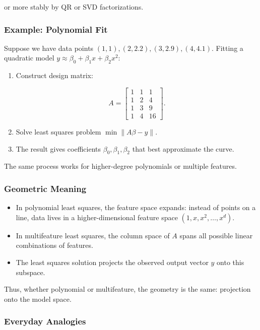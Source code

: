 \documentclass[
  letterpaper,
  DIV=11,
  numbers=noendperiod]{scrreprt}
\providecommand{\tightlist}{%
  \setlength{\itemsep}{0pt}\setlength{\parskip}{0pt}}
\begin{document}
or more stably by QR or SVD factorizations.

\subsubsection{Example: Polynomial Fit}\label{example-polynomial-fit}

Suppose we have data points \((1,1), (2,2.2), (3,2.9), (4,4.1)\).
Fitting a quadratic model
\(y \approx \beta_0 + \beta_1 x + \beta_2 x^2\):

\begin{enumerate}
\def\labelenumi{\arabic{enumi}.}
\item
  Construct design matrix:

  \[
  A = \begin{bmatrix}
  1 & 1 & 1 \\
  1 & 2 & 4 \\
  1 & 3 & 9 \\
  1 & 4 & 16
  \end{bmatrix}.
  \]
\item
  Solve least squares problem \(\min \|A\beta - y\|\).
\item
  The result gives coefficients \(\beta_0, \beta_1, \beta_2\) that best
  approximate the curve.
\end{enumerate}

The same process works for higher-degree polynomials or multiple
features.

\subsubsection{Geometric Meaning}\label{geometric-meaning-24}

\begin{itemize}
\tightlist
\item
  In polynomial least squares, the feature space expands: instead of
  points on a line, data lives in a higher-dimensional feature space
  \((1, x, x^2, \dots, x^d)\).
\item
  In multifeature least squares, the column space of \(A\) spans all
  possible linear combinations of features.
\item
  The least squares solution projects the observed output vector \(y\)
  onto this subspace.
\end{itemize}

Thus, whether polynomial or multifeature, the geometry is the same:
projection onto the model space.

\subsubsection{Everyday Analogies}\label{everyday-analogies-76}
\end{document}
